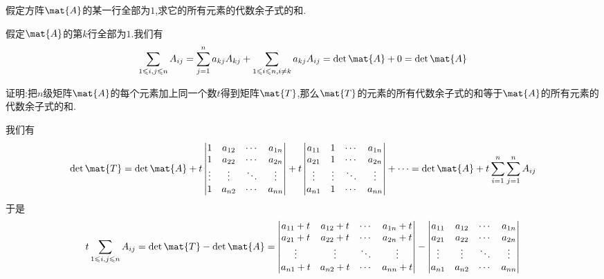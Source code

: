 \documentclass{ctexart}
\begin{document}
\begin{problem}
    假定方阵$\mat{A}$的某一行全部为$1$,求它的所有元素的代数余子式的和.
\end{problem}
\begin{solution}
    假定$\mat{A}$的第$k$行全部为$1$.我们有
    \[\sum_{1\leqslant i,j\leqslant n}A_{ij}=\sum_{j=1}^{n}a_{kj}A_{kj}+\sum_{1\leqslant i\leqslant n,i\neq k}a_{kj}A_{ij}=\det\mat{A}+0=\det\mat{A}\]
\end{solution}
\begin{problem}
    证明:把$n$级矩阵$\mat{A}$的每个元素加上同一个数$t$得到矩阵$\mat{T}$,那么$\mat{T}$的元素的所有代数余子式的和等于$\mat{A}$的所有元素的代数余子式的和.
\end{problem}
\begin{solution}
    我们有
    \[\det\mat{T}=\det\mat{A}+t\begin{vmatrix}
        1&a_{12}&\cdots&a_{1n}\\
        1&a_{22}&\cdots&a_{2n}\\
        \vdots&\vdots&\ddots&\vdots\\
        1&a_{n2}&\cdots&a_{nn}
    \end{vmatrix}+t\begin{vmatrix}
        a_{11}&1&\cdots&a_{1n}\\
        a_{21}&1&\cdots&a_{2n}\\
        \vdots&\vdots&\ddots&\vdots\\
        a_{n1}&1&\cdots&a_{nn}
    \end{vmatrix}+\cdots=\det\mat{A}+t\sum_{i=1}^{n}\sum_{j=1}^{n}A_{ij}\]
    于是
    \[\begin{aligned}
        t\sum_{1\leqslant i,j\leqslant n}A_{ij}
        &=\det\mat{T}-\det\mat{A}=\begin{vmatrix}
        a_{11}+t&a_{12}+t&\cdots&a_{1n}+t\\
        a_{21}+t&a_{22}+t&\cdots&a_{2n}+t\\
        \vdots&\vdots&\ddots&\vdots\\
        a_{n1}+t&a_{n2}+t&\cdots&a_{nn}+t
        \end{vmatrix}-\begin{vmatrix}
            a_{11}&a_{12}&\cdots&a_{1n}\\
            a_{21}&a_{22}&\cdots&a_{2n}\\
            \vdots&\vdots&\ddots&\vdots\\
            a_{n1}&a_{n2}&\cdots&a_{nn}
        \end{vmatrix}\\

\end{aligned}\]
\end{solution}
\end{document}
